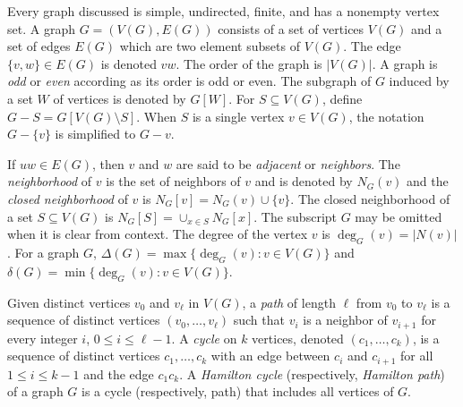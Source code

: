 \documentclass{article}
\numberwithin{figure}{section}
\numberwithin{table}{section}
\numberwithin{equation}{section}
\theoremstyle{definition}
\theoremstyle{definition}
\theoremstyle{definition}
\begin{document}
  Every graph discussed is  simple, undirected, finite, and has a nonempty vertex set. A graph $G=(V(G),E(G))$ consists of a set of vertices $V(G)$ and a set of edges $E(G)$ which are two element subsets of $V(G)$. The edge $\{v,w\} \in E(G)$ is denoted $vw$. The order of the graph is $|V(G)|$. A graph is \emph{odd} or \emph{even} according as its order is odd or even. The subgraph of $G$ induced by a set $W$ of vertices is denoted by $G[W]$.
 For $S\subseteq V(G)$, define $G - S=G[V(G)\setminus S]$. When $S$ is a single vertex $v\in V(G)$, the notation $G - \{v\}$ is simplified to $G - v$.

If $uw \in E(G)$, then $v$ and $w$ are said to be \emph{adjacent} or \emph{neighbors}.  The \emph{neighborhood} of $v$ is the set of neighbors of $v$ and is denoted by $N_G(v)$ and the \emph{closed neighborhood} of $v$ is $N_G[v]=N_G(v)\cup\{v\}$. The closed neighborhood of a set $S\subseteq V(G)$ is  $N_G[S]=\cup_{x\in S}N_G[x]$.  The subscript $G$ may be omitted when it is clear from context. The degree of the vertex $v$ is  $\deg_G(v)=|N(v)|$. For a graph $G$, $\Delta(G)=\max\{\deg_G(v):v \in V(G)\}$ and $\delta(G)=\min\{\deg_G(v):v \in V(G)\}$.

 
Given distinct vertices $v_0$ and $v_{\ell}$ in $V(G)$,  a \emph{path} of length $\ell$  from $v_0$ to $v_{\ell}$ is a sequence of distinct vertices $(v_0,\ldots, v_{\ell})$ such that 
$v_i$ is a neighbor of $v_{i+1}$ for every integer $i$, $0\leq i\leq \ell -1$. A \emph{cycle} on $k$ vertices, denoted $(c_1, \dots, c_k)$, is a sequence of distinct vertices $c_1, \dots, c_k$ with an edge between $c_i$ and $c_{i+1}$ for all $1 \leq i \leq k-1$ and the edge $c_1c_k$.   A \emph{Hamilton cycle} (respectively,  \emph{Hamilton path})  of a graph $G$ is a cycle (respectively, path) that includes all vertices of $G$.
\end{document}

